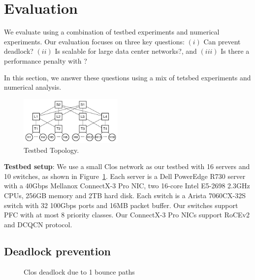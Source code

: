 \section{Evaluation}\label{sec:eval}

We evaluate \sysname{} using a combination of testbed experiments and numerical
experiments. Our evaluation focuses on three key questions: $(i)$ Can \sysname{}
prevent deadlock? $(ii)$ Is \sysname{} scalable for large data center networks?,
and $(iii)$ Is there a performance penalty with \sysname{}?

In this section, we answer these questions using a mix of tetsbed experiments
and numerical analysis.

\begin{figure}
	\centering
	\includegraphics[width=0.45\textwidth] {figs/testbed_topo}
	\caption{Testbed Topology.}\label{fig:testbed_topo}
\end{figure}

\textbf{Testbed setup}: We use a small Clos network as our testbed with 16
servers and 10 switches, as shown in Figure~\ref{fig:testbed_topo}. Each server
is a Dell PowerEdge R730 server with a 40Gbps Mellanox ConnectX-3 Pro NIC, two
16-core Intel E5-2698 2.3GHz CPUs, 256GB memory and 2TB hard disk. Each switch
is a Arista 7060CX-32S switch with 32 100Gbps ports and 16MB packet buffer. Our
switches support PFC with at most 8 priority classes. Our ConnectX-3 Pro NICs
support RoCEv2 and DCQCN protocol.

\subsection{Deadlock prevention}\label{subsec:exp_validation}

\begin{figure}[t]
	\centering
	
	
	\caption{Clos deadlock due to 1 bounce paths}\label{fig:exp_validation_nonloop}
	
\end{figure}

